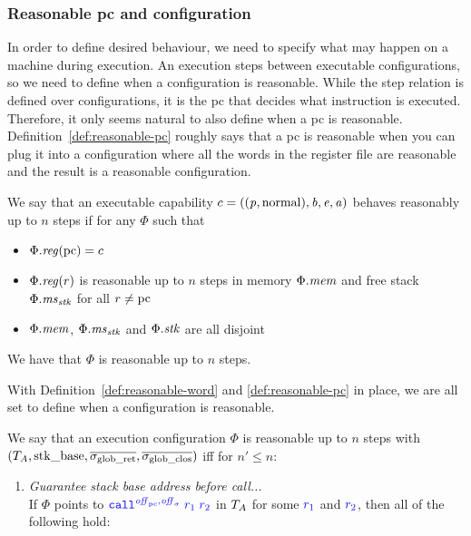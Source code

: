 \documentclass{jfp}
\renewcommand{\perm}{\var{p}}
\newenvironment{jversion}{}{}
\begin{document}
\begin{jversion}
\subsubsection{Reasonable pc and configuration}
In order to define desired behaviour, we need to specify what may happen on a machine during execution.
An execution steps between executable configurations, so we need to define when a configuration is reasonable.
While the step relation is defined over configurations, it is the pc that decides what instruction is executed.
Therefore, it only seems natural to also define when a pc is reasonable.
Definition~\ref{def:reasonable-pc} roughly says that a pc is reasonable when you can plug it into a configuration where all the words in the register file are reasonable and the result is a reasonable configuration.
  \begin{definition}[Reasonable pc]
    \label{def:reasonable-pc}
    We say that an executable capability $c =
    ((\perm,\normal),\baddr,\eaddr,\aaddr)$ behaves reasonably up to $n$ steps
    if for any $\Phi$ such that
    \begin{itemize}
    \item $\Phi.\reg(\pcreg) = c$
    \item $\Phi.\reg(r)$ is reasonable up to $n$ steps in memory $\Phi.\mathit{mem}$ and
      free stack $\Phi.\mathit{ms}_{\mathit{stk}}$ for all $r \neq \mathrm{pc}$
    \item $\Phi.\mathit{mem}$, $\Phi.\mathit{ms}_{\mathit{stk}}$ and $\Phi.\mathit{stk}$ are all disjoint
    \end{itemize}
    We have that $\Phi$ is reasonable up to $n$ steps.
  \end{definition}
  With Definition~\ref{def:reasonable-word} and \ref{def:reasonable-pc} in place, we are all set to define when a configuration is reasonable.
  \begin{definition}
    \label{def:reasonable-conf}
    We say that an execution configuration $\Phi$ is reasonable up to $n$ steps with $(T_{A},\mathrm{stk\_base},\overline{\sigma_{\mathrm{glob\_ret}}},\overline{\sigma_{\mathrm{glob\_clos}}})$ 
    iff for $n' \leq n$:
    \begin{enumerate}
    \item \label{item:guarantee-stk-base} \emph{Guarantee stack base address before call...} \\
      If $\Phi$ points to $\src{\scall{\offpc,\offsigma}{r_1}{r_2}}$ in $T_{A}$
      for some ${\color{blue} r_1}$ and ${\color{blue} r_2}$,
      then all of the following hold:
\end{enumerate}
\end{definition}
\end{jversion}
\end{document}
